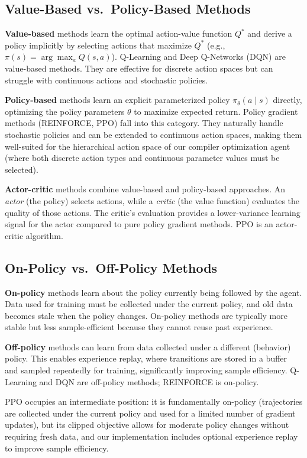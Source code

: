 \subsection{Value-Based vs.\ Policy-Based Methods}

\textbf{Value-based} methods learn the optimal action-value function $Q^*$ and derive a policy implicitly by selecting actions that maximize $Q^*$ (e.g., $\pi(s) = \arg\max_a Q(s, a)$). Q-Learning and Deep Q-Networks (DQN) are value-based methods. They are effective for discrete action spaces but can struggle with continuous actions and stochastic policies.

\textbf{Policy-based} methods learn an explicit parameterized policy $\pi_\theta(a \mid s)$ directly, optimizing the policy parameters $\theta$ to maximize expected return. Policy gradient methods (REINFORCE, PPO) fall into this category. They naturally handle stochastic policies and can be extended to continuous action spaces, making them well-suited for the hierarchical action space of our compiler optimization agent (where both discrete action types and continuous parameter values must be selected).

\textbf{Actor-critic} methods combine value-based and policy-based approaches. An \textit{actor} (the policy) selects actions, while a \textit{critic} (the value function) evaluates the quality of those actions. The critic's evaluation provides a lower-variance learning signal for the actor compared to pure policy gradient methods. PPO is an actor-critic algorithm.

\subsection{On-Policy vs.\ Off-Policy Methods}

\textbf{On-policy} methods learn about the policy currently being followed by the agent. Data used for training must be collected under the current policy, and old data becomes stale when the policy changes. On-policy methods are typically more stable but less sample-efficient because they cannot reuse past experience.

\textbf{Off-policy} methods can learn from data collected under a different (behavior) policy. This enables experience replay, where transitions are stored in a buffer and sampled repeatedly for training, significantly improving sample efficiency. Q-Learning and DQN are off-policy methods; REINFORCE is on-policy.

PPO occupies an intermediate position: it is fundamentally on-policy (trajectories are collected under the current policy and used for a limited number of gradient updates), but its clipped objective allows for moderate policy changes without requiring fresh data, and our implementation includes optional experience replay to improve sample efficiency.

